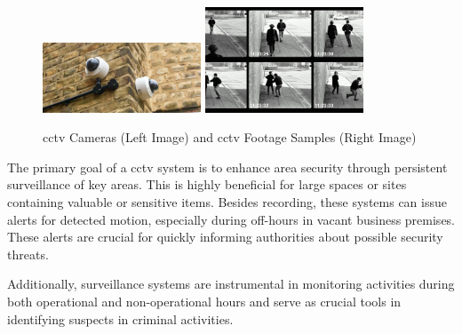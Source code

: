\begin{figure}[h]
    \centering
    \includegraphics[width=0.42\textwidth]{figs/cctv.jpg}
    \hfill
    \includegraphics[width=0.42\textwidth]{figs/cctv-footage.png}
    \caption{\ac{cctv} Cameras (Left Image) and \ac{cctv} Footage Samples (Right Image)}
    \label{fig:cctv-and-footage}
\end{figure}

The primary goal of a \ac{cctv} system is to enhance area security through persistent surveillance of key areas. This 
is highly beneficial for large spaces or sites containing valuable or sensitive items. Besides recording, these systems 
can issue alerts for detected motion, especially during off-hours in vacant business premises. These alerts are crucial 
for quickly informing authorities about possible security threats. 

Additionally, surveillance systems are instrumental 
in monitoring activities during both operational and non-operational hours and serve as crucial tools in identifying 
suspects in criminal activities.

